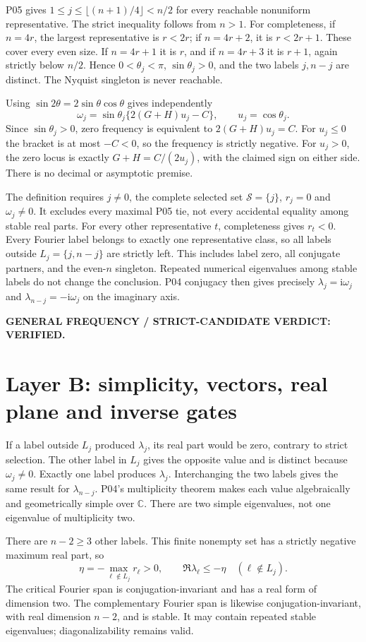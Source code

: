 \documentclass[11pt]{article}
\newcommand{\ii}{\mathrm i}
\newcommand{\C}{\mathbb C}
\begin{document}
P05 gives $1\le j\le\lfloor(n+1)/4\rfloor<n/2$ for every reachable
nonuniform representative. The strict inequality follows from $n>1$.
For completeness, if $n=4r$, the largest representative is $r<2r$;
if $n=4r+2$, it is $r<2r+1$. These cover every even size. If $n=4r+1$
it is $r$, and if $n=4r+3$ it is $r+1$, again strictly below $n/2$.
Hence $0<\theta_j<\pi$, $\sin\theta_j>0$, and the two labels
$j,n-j$ are distinct. The Nyquist singleton is never reachable.

Using $\sin2\theta=2\sin\theta\cos\theta$ gives independently
\[
 \omega_j=\sin\theta_j\{2(G+H)u_j-C\},\qquad u_j=\cos\theta_j.
\]
Since $\sin\theta_j>0$, zero frequency is equivalent to
$2(G+H)u_j=C$. For $u_j\le0$ the bracket is at most $-C<0$,
so the frequency is strictly negative. For $u_j>0$, the zero locus is
exactly $G+H=C/(2u_j)$, with the claimed sign on either side.
There is no decimal or asymptotic premise.

The definition requires $j\ne0$, the complete selected set
$\mathcal S=\{j\}$, $r_j=0$ and $\omega_j\ne0$. It excludes every
maximal P05 tie, not every accidental equality among stable real parts.
For every other representative $t$, completeness gives $r_t<0$.
Every Fourier label belongs to exactly one representative class, so all
labels outside $L_j=\{j,n-j\}$ are strictly left. This includes label
zero, all conjugate partners, and the even-$n$ singleton. Repeated
numerical eigenvalues among stable labels do not change the conclusion.
P04 conjugacy then gives precisely $\lambda_j=\ii\omega_j$ and
$\lambda_{n-j}=-\ii\omega_j$ on the imaginary axis.

\noindent\textbf{GENERAL FREQUENCY / STRICT-CANDIDATE VERDICT: VERIFIED.}

\section{Layer B: simplicity, vectors, real plane and inverse gates}
\label{sec:B}
If a label outside $L_j$ produced $\lambda_j$, its real part would be
zero, contrary to strict selection. The other label in $L_j$ gives the
opposite value and is distinct because $\omega_j\ne0$. Exactly one
label produces $\lambda_j$. Interchanging the two labels gives the
same result for $\lambda_{n-j}$. P04's multiplicity theorem makes each
value algebraically and geometrically simple over $\C$. There are two
simple eigenvalues, not one eigenvalue of multiplicity two.

There are $n-2\ge3$ other labels. This finite nonempty set has a
strictly negative maximum real part, so
\[
 \eta=-\max_{\ell\notin L_j}r_\ell>0,
 \qquad \Re\lambda_\ell\le-\eta\quad(\ell\notin L_j).
\]
The critical Fourier span is conjugation-invariant and has a real form of
dimension two. The complementary Fourier span is likewise
conjugation-invariant, with real dimension $n-2$, and is stable. It may
contain repeated stable eigenvalues; diagonalizability remains valid.
\end{document}
